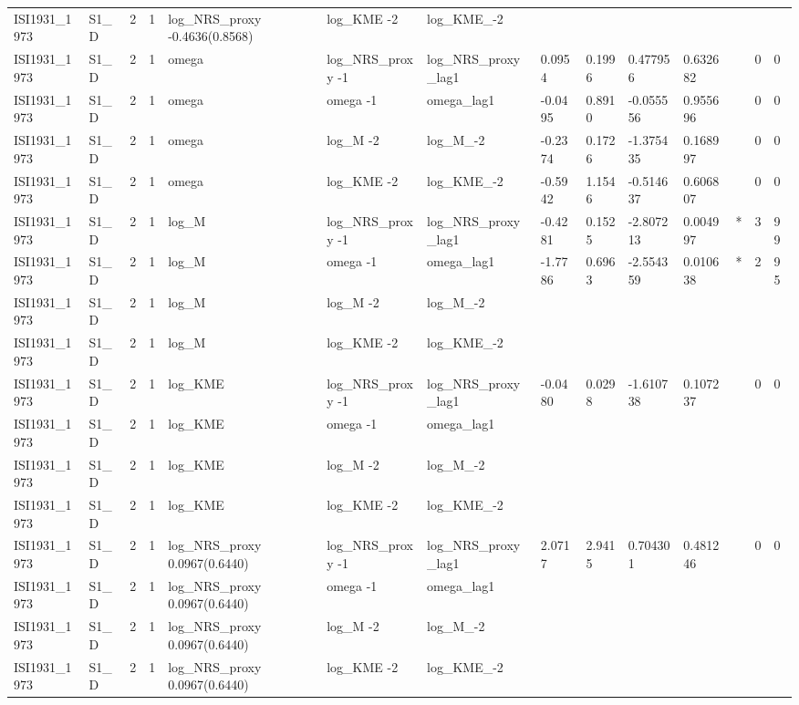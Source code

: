 \begin{tabular}{llllllllllllll}
ISI1931\_1973 & S1\_D & 2 & 1 & log\_NRS\_proxy -0.4636(0.8568) & log\_KME -2 & log\_KME\_-2 &  &  &  &  &  &  &  \\
ISI1931\_1973 & S1\_D & 2 & 1 & omega & log\_NRS\_proxy -1 & log\_NRS\_proxy\_lag1 & 0.0954 & 0.1996 & 0.477956 & 0.632682 &  & 0 & 0 \\
ISI1931\_1973 & S1\_D & 2 & 1 & omega & omega -1 & omega\_lag1 & -0.0495 & 0.8910 & -0.055556 & 0.955696 &  & 0 & 0 \\
ISI1931\_1973 & S1\_D & 2 & 1 & omega & log\_M -2 & log\_M\_-2 & -0.2374 & 0.1726 & -1.375435 & 0.168997 &  & 0 & 0 \\
ISI1931\_1973 & S1\_D & 2 & 1 & omega & log\_KME -2 & log\_KME\_-2 & -0.5942 & 1.1546 & -0.514637 & 0.606807 &  & 0 & 0 \\
ISI1931\_1973 & S1\_D & 2 & 1 & log\_M & log\_NRS\_proxy -1 & log\_NRS\_proxy\_lag1 & -0.4281 & 0.1525 & -2.807213 & 0.004997 & * & 3 & 99 \\
ISI1931\_1973 & S1\_D & 2 & 1 & log\_M & omega -1 & omega\_lag1 & -1.7786 & 0.6963 & -2.554359 & 0.010638 & * & 2 & 95 \\
ISI1931\_1973 & S1\_D & 2 & 1 & log\_M & log\_M -2 & log\_M\_-2 &  &  &  &  &  &  &  \\
ISI1931\_1973 & S1\_D & 2 & 1 & log\_M & log\_KME -2 & log\_KME\_-2 &  &  &  &  &  &  &  \\
ISI1931\_1973 & S1\_D & 2 & 1 & log\_KME & log\_NRS\_proxy -1 & log\_NRS\_proxy\_lag1 & -0.0480 & 0.0298 & -1.610738 & 0.107237 &  & 0 & 0 \\
ISI1931\_1973 & S1\_D & 2 & 1 & log\_KME & omega -1 & omega\_lag1 &  &  &  &  &  &  &  \\
ISI1931\_1973 & S1\_D & 2 & 1 & log\_KME & log\_M -2 & log\_M\_-2 &  &  &  &  &  &  &  \\
ISI1931\_1973 & S1\_D & 2 & 1 & log\_KME & log\_KME -2 & log\_KME\_-2 &  &  &  &  &  &  &  \\
ISI1931\_1973 & S1\_D & 2 & 1 & log\_NRS\_proxy 0.0967(0.6440) & log\_NRS\_proxy -1 & log\_NRS\_proxy\_lag1 & 2.0717 & 2.9415 & 0.704301 & 0.481246 &  & 0 & 0 \\
ISI1931\_1973 & S1\_D & 2 & 1 & log\_NRS\_proxy 0.0967(0.6440) & omega -1 & omega\_lag1 &  &  &  &  &  &  &  \\
ISI1931\_1973 & S1\_D & 2 & 1 & log\_NRS\_proxy 0.0967(0.6440) & log\_M -2 & log\_M\_-2 &  &  &  &  &  &  &  \\
ISI1931\_1973 & S1\_D & 2 & 1 & log\_NRS\_proxy 0.0967(0.6440) & log\_KME -2 & log\_KME\_-2 &  &  &  &  &  &  &  \\

\end{tabular}
